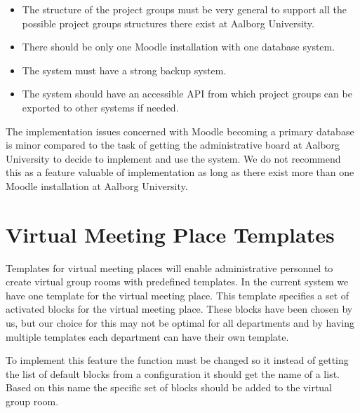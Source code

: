 \begin{itemize}
	\item The structure of the project groups must be very general to support all the possible project groups structures there exist at Aalborg University. 
	\item There should be only one Moodle installation with one database system. 
	\item The system must have a strong backup system.
	\item The system should have an accessible API from which project groups can be exported to other systems if needed. 
\end{itemize}

The implementation issues concerned with Moodle becoming a primary database is minor compared to the task of getting the administrative board at Aalborg University to decide to implement and use the system. 
We do not recommend this as a feature valuable of implementation as long as there exist more than one Moodle installation at Aalborg University. 


\section{Virtual Meeting Place Templates} 
\label{sec:templates}
Templates for virtual meeting places will enable administrative personnel to create virtual group rooms with predefined templates.
In the current system we have one template for the virtual meeting place. 
This template specifies a set of activated blocks for the virtual meeting place. 
These blocks have been chosen by us, but our choice for this may not be optimal for all departments and by having multiple templates each department can have their own template.

To implement this feature the function  must be changed so it instead of getting the list of default blocks from a configuration it should get the name of a list.
Based on this name the specific set of blocks should be added to the virtual group room.

